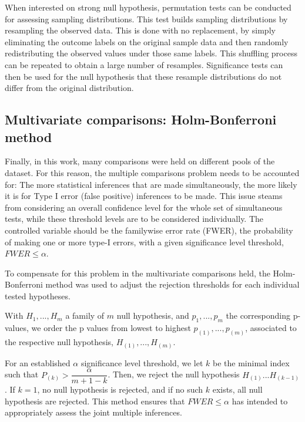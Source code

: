 When interested on strong null hypothesis, permutation tests can be conducted for assessing sampling distributions. This test builds sampling distributions by resampling the observed data. This is done with no replacement, by simply eliminating the outcome labels on the original sample data and then randomly redistributing the observed values under those same labels. This shuffling process can be repeated to obtain a large number of resamples.
Significance tests can then be used for the null hypothesis that these resample distributions do not differ from the original distribution.

\subsection{Multivariate comparisons: Holm-Bonferroni method}

Finally, in this work, many comparisons were held on different pools of the dataset. For this reason, the multiple comparisons problem needs to be accounted for: The more statistical inferences that are made simultaneously, the more likely it is for Type I error (false positive) inferences to be made. This issue steams from considering an overall confidence level for the whole set of simultaneous tests, while these threshold levels are to be considered individually. The controlled variable should be the familywise error rate (FWER), the probability of making one or more type-I errors, with a given significance level threshold, $FWER \leq \alpha$.

To compensate for this problem in the multivariate comparisons held, the Holm-Bonferroni method was used to adjust the rejection thresholds for each individual tested hypotheses. 

With $H_1,...,H_m$ a family of $m$ null hypothesis, and $p_1,...,p_m$ the corresponding p-values, we order the p values from lowest to highest $p_{(1)},...,p_{(m)}$, associated to the respective null hypothesis, $H_{(1)},...,H_{(m)}$.

For an established $\alpha$ significance level threshold, we let $k$ be the minimal index such that $P_{(k)}> \dfrac{\alpha}{m+1-k}$. Then, we reject the null hypothesis $H_{(1)}...H_{(k-1)}$. If $k=1$, no null hypothesis is rejected, and if no such $k$ exists, all null hypothesis are rejected. This method ensures that $FWER \leq \alpha$ has intended to appropriately assess the joint multiple inferences.